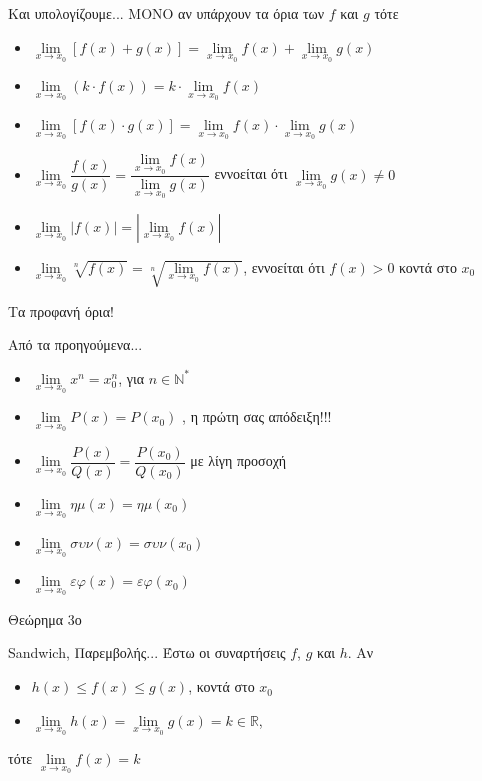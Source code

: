 \documentclass[greek]{beamer}
\begin{document}
\begin{frame}{Και υπολογίζουμε...}
  ΜΟΝΟ αν υπάρχουν τα όρια των $f$ και $g$ τότε
  \begin{itemize}
    \item $\lim\limits_{x \to x_0}{ \left[ f(x)+g(x) \right] }=\lim\limits_{x \to x_0}{ f(x) }+\lim\limits_{x \to x_0}{ g(x) }$
    \item $\lim\limits_{x \to x_0}{ \left( k\cdot f(x) \right) }=k\cdot \lim\limits_{x \to x_0}{ f(x) }$
    \item $\lim\limits_{x \to x_0}{ \left[ f(x)\cdot g(x) \right]}=\lim\limits_{x \to x_0}{ f(x) }\cdot\lim\limits_{x \to x_0}{ g(x) }$
    \item $\lim\limits_{x \to x_0}{ \dfrac{f(x)}{g(x)} }=\dfrac{\lim\limits_{x \to x_0}{ f(x) }}{\lim\limits_{x \to x_0}{ g(x) }}$ εννοείται ότι $\lim\limits_{x \to x_0}{ g(x) }\ne 0$
    \item $\lim\limits_{x \to x_0}{ |f(x)| }=|\lim\limits_{x \to x_0}{ f(x) }|$
    \item $\lim\limits_{x \to x_0}{ \sqrt[n]{f(x)} }=\sqrt[n]{\lim\limits_{x \to x_0}{ f(x) }}$, εννοείται ότι $f(x)>0$ κοντά στο $x_0$
  \end{itemize}
\end{frame}

\begin{frame}{Τα προφανή όρια!}
  \begin{block}{Από τα προηγούμενα...}
    \begin{itemize}
      \item $\lim\limits_{x \to x_0}{ x^n }=x_0^n$, για $n\in \mathbb{N}^*$ \pause
      \item $\lim\limits_{x \to x_0}{ P(x) }=P(x_0)$ \pause, η πρώτη σας απόδειξη!!! \pause
      \item $\lim\limits_{x \to x_0}{ \dfrac{P(x)}{Q(x)} }=\dfrac{P(x_0)}{Q(x_0)}$ \pause με λίγη προσοχή \pause
      \item $\lim\limits_{x \to x_0}{ ημ(x) }=ημ(x_0)$ \pause
      \item $\lim\limits_{x \to x_0}{ συν(x) }=συν(x_0)$ \pause
      \item $\lim\limits_{x \to x_0}{ εφ(x) }=εφ(x_0)$
    \end{itemize}
  \end{block}
\end{frame}

\begin{frame}{Θεώρημα 3ο}
  \begin{block}{Sandwich, Παρεμβολής...}
    Έστω οι συναρτήσεις $f$, $g$ και $h$. Αν
    \begin{itemize}
      \item<1-> $h(x)\le f(x) \le g(x)$, κοντά στο $x_0$
      \item<2-> $\lim\limits_{x \to x_0}{ h(x) }=\lim\limits_{x \to x_0}{ g(x) }=k \in\mathbb{R}$,
    \end{itemize}
    τότε $\lim\limits_{x \to x_0}{ f(x) }=k$
  \end{block}
\end{frame}
\end{document}

